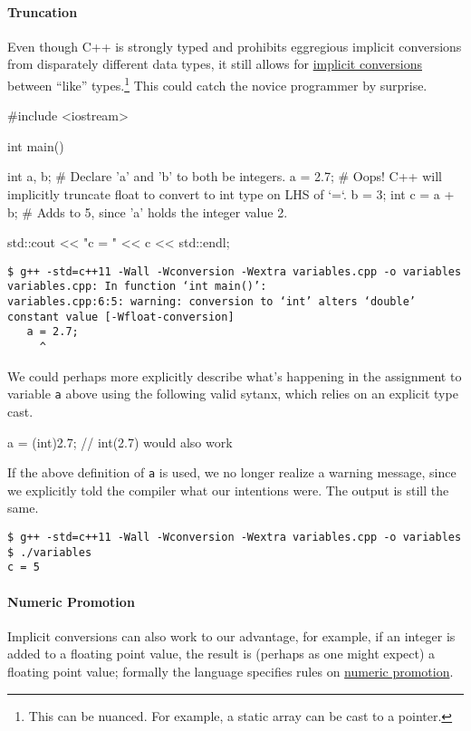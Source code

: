\documentclass[12pt,letterpaper,twoside]{article}
\begin{document}
\paragraph{Truncation}
Even though C++ is strongly typed and prohibits eggregious implicit
conversions from disparately different data types, it still allows for
\href{https://en.cppreference.com/w/c/language/conversion}{implicit
  conversions} between ``like'' types.\footnote{This can be
  nuanced. For example, a static array can be cast to a pointer.}
This could catch the novice programmer by surprise.
\begin{cpp}
#include <iostream>

int main() {
  int a, b;   # Declare 'a' and 'b' to both be integers.
  a = 2.7;    # Oops! C++ will implicitly truncate float to convert to int type on LHS of `=`.
  b = 3;
  int c = a + b;  # Adds to 5, since 'a' holds the integer value 2.

  std::cout << "c = " << c << std::endl;
}
\end{cpp}

\begin{verbatim}
$ g++ -std=c++11 -Wall -Wconversion -Wextra variables.cpp -o variables
variables.cpp: In function ‘int main()’:
variables.cpp:6:5: warning: conversion to ‘int’ alters ‘double’ constant value [-Wfloat-conversion]
   a = 2.7;
     ^
\end{verbatim}

We could perhaps more explicitly describe what's happening in the
assignment to variable \texttt{a} above using the following valid
sytanx, which relies on an explicit type cast.

\begin{cpp}
  a = (int)2.7; // int(2.7) would also work
\end{cpp}

If the above definition of \texttt{a} is used, we no longer realize a
warning message, since we explicitly told the compiler what our
intentions were. The output is still the same.

\begin{verbatim}
$ g++ -std=c++11 -Wall -Wconversion -Wextra variables.cpp -o variables
$ ./variables 
c = 5
\end{verbatim}

\paragraph{Numeric Promotion}
Implicit conversions can also work to our
advantage, for example, if an integer is added
to a floating point value, the result is (perhaps as one might expect)
a floating point value; formally the language specifies rules on
\href{https://en.cppreference.com/w/cpp/language/implicit_conversion}{numeric promotion}.
\end{document}
